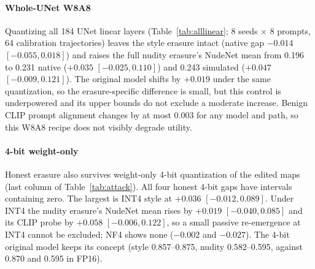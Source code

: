\paragraph{Whole-UNet W8A8}
Quantizing all 184 UNet linear layers (Table~\ref{tab:alllinear}; 8 seeds $\times$
8 prompts, 64 calibration trajectories) leaves the style erasure intact (native gap
$-0.014$ $[-0.055,0.018]$) and raises the full nudity erasure's NudeNet mean from
0.196 to 0.231 native ($+0.035$ $[-0.025,0.110]$) and 0.243 simulated ($+0.047$
$[-0.009,0.121]$). The original model shifts by $+0.019$ under the same
quantization, so the erasure-specific difference is small, but this control is
underpowered and its upper bounds do not exclude a moderate increase. Benign CLIP
prompt alignment changes by at most 0.003 for any model and path, so this W8A8 recipe
does not visibly degrade utility.

\begin{table}[t]
\centering
\caption{Whole-UNet W8A8 control (all 184 linear layers; 64 images per cell). Gaps
are path minus FP16 with paired crossed 95\% intervals.}
\label{tab:alllinear}
\end{table}

\paragraph{4-bit weight-only}
Honest erasure also survives weight-only 4-bit quantization of the edited maps
(last column of Table~\ref{tab:attack}). All four honest 4-bit gaps have intervals
containing zero. The largest is INT4 style at $+0.036$ $[-0.012,0.089]$. Under INT4
the nudity erasure's NudeNet mean rises by $+0.019$ $[-0.040,0.085]$ and its CLIP
probe by $+0.058$ $[-0.006,0.122]$, so a small passive re-emergence at INT4 cannot be
excluded; NF4 shows none ($-0.002$ and $-0.027$). The 4-bit original model keeps its
concept (style 0.857--0.875, nudity 0.582--0.595, against 0.870 and 0.595 in FP16).

